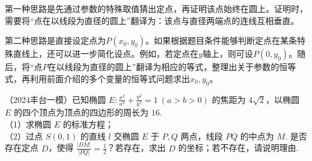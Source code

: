 第一种思路是先通过参数的特殊取值猜出定点，再证明该点始终在圆上。证明时，需要将“点在以线段为直径的圆上”翻译为：该点与直径两端点的连线互相垂直。

第二种思路是直接设定点为\(P(x_0,y_0)\)。如果根据题目条件能够判断定点在某条特殊直线上，还可以进一步简化设点。例如，若定点在\(y\)轴上，则可设\(P(0,y_0)\)。随后，将“点\(P\)在以线段为直径的圆上”翻译为相应的等式，整理出关于参数的恒等式，再利用前面介绍的多个变量的恒等式问题求出\(x_0,y_0\)。









\begin{example} %
（2024丰台一模）已知椭圆 $E:\frac{x^2}{a^2}+\frac{y^2}{b^2}=1\ (a>b>0)$ 的焦距为 $4\sqrt{2}$，以椭圆 $E$ 的四个顶点为顶点的四边形的周长为 $16$.\\
（1）求椭圆 $E$ 的标准方程；\\
（2）过点 $S(0,1)$ 的直线 $l$ 交椭圆 $E$ 于 $P,Q$ 两点，线段 $PQ$ 的中点为 $M$. 是否存在定点 $D$，使得 $\frac{\lvert DM\rvert}{\lvert PQ\rvert}=\frac{1}{2}$？若存在，求出 $D$ 的坐标；若不存在，请说明理由.
\end{example}











